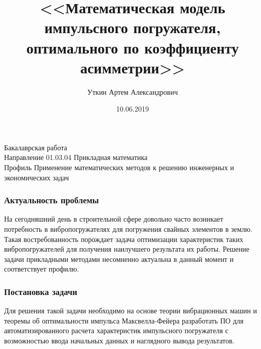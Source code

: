 \documentclass[10pt, pdf, hyperref={unicode}]{beamer}
\title{<<Математическая модель импульсного погружателя, оптимального по коэффициенту асимметрии>>}
\date{10.06.2019}
\author{Уткин Артем Александрович}
\begin{document}
    \begin{frame} %
        \titlepage
        \begin{center}
            Бакалаврская работа\\
            Направление 01.03.04 Прикладная математика\\
            Профиль Применение математических методов к решению инженерных и экономических задач
        \end{center}
    \end{frame}


    \begin{frame}
        \frametitle{Актуальность проблемы}
        \begin{center}
            \begin{minipage}[h]{0.97\linewidth}
                На сегодняшний день в строительной сфере довольно часто возникает потребность в вибропогружателях для погружения свайных элементов в землю.
                \newline
                Такая востребованность порождает задача оптимизации характеристик таких вибропогружателей для получения наилучшего результата их работы.
                \newline
                Решение задачи прикладными методами несомненно актуальна в данный момент и соответствует профилю.
            \end{minipage}
        \end{center}
    \end{frame}


    \begin{frame}
        \frametitle{Постановка задачи}
        \begin{center}
            \begin{minipage}[h]{0.97\linewidth}
                Для решения такой задачи необходимо на основе теории вибрационных машин и теоремы об оптимальности импульса Максвелла-Фейера
                разработать ПО для автоматизированного расчета характеристик импульсного погружателя
                с возможностью ввода начальных данных и наглядного вывода результатов.
            \end{minipage}
        \end{center}
    \end{frame}
\end{document}
